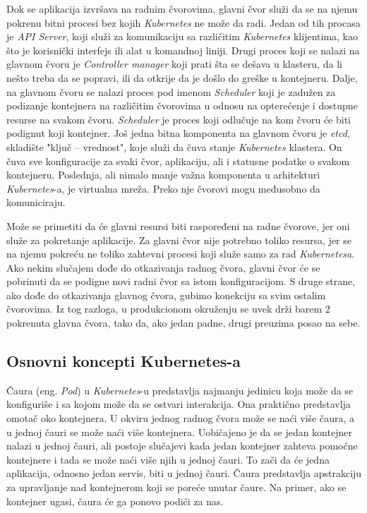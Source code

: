 Dok se aplikacija izvršava na radnim čvorovima, glavni čvor služi da se na njemu pokrenu bitni procesi 
bez kojih \textit{Kubernetes} ne može da radi. Jedan od tih procasa je {\em API Server}, koji služi za 
komunikaciju sa različitim \textit{Kubernetes} klijentima, kao što je korisnički interfejs ili alat u 
komandnoj liniji. Drugi proces koji se nalazi na glavnom čvoru je {\em Controller manager} koji 
prati šta se dešava u klasteru, da li nešto treba da se popravi, ili da otkrije da je došlo do greške 
u kontejneru. Dalje, na glavnom čvoru se nalazi proces pod imenom {\em Scheduler} koji je zadužen 
za podizanje kontejnera na različitim čvorovima u odnosu na opterećenje i dostupne resurse na svakom 
čvoru. \textit{Scheduler} je proces koji odlučuje na kom čvoru će biti podignut koji kontejner. 
Još jedna bitna komponenta na glavnom čvoru je {\em etcd}, skladište "ključ -- vrednost", koje služi 
da čuva stanje \textit{Kubernetes} klastera. On čuva sve konfiguracije za svaki čvor, aplikaciju, ali i statusne 
podatke o svakom kontejneru. Poslednja, ali nimalo manje važna komponenta u arhitekturi \textit{Kubernetes}-a, 
je virtualna mreža. Preko nje čvorovi mogu međusobno da komuniciraju. 

Može se primetiti da će glavni resursi biti raspoređeni na radne čvorove, jer oni služe za pokretanje 
aplikacije. Za glavni čvor nije potrebno toliko resursa, jer se na njemu pokreću ne toliko zahtevni procesi 
koji služe samo za rad \textit{Kubernetesa}. Ako nekim slučajem dođe do otkazivanja radnog čvora, glavni čvor 
će se pobrinuti da se podigne novi radni čvor sa istom konfiguracijom. S druge strane, ako dođe do 
otkazivanja glavnog čvora, gubimo konekciju sa svim ostalim čvorovima. Iz tog razloga, u produkcionom 
okruženju se uvek drži barem 2 pokrenuta glavna čvora, tako da, ako jedan padne, drugi preuzima 
posao na sebe.

\subsection{Osnovni koncepti Kubernetes-a}
Čaura (eng. {\em Pod}) u \textit{Kubernetes}-u predstavlja najmanju jedinicu koja može da se konfiguriše i sa kojom može da 
se ostvari interakcija. Ona praktično predstavlja omotač oko kontejnera. U okviru jednog radnog čvora 
može se naći više čaura, a u jednoj čauri se može naći više kontejnera. Uobičajeno je da se jedan 
kontejner nalazi u jednoj čauri, ali postoje slučajevi kada jedan kontejner zahteva pomoćne kontejnere 
i tada se može naći više njih u jednoj čauri. To zači da će jedna aplikacija, odnosno jedan servis, 
biti u jednoj čauri. Čaura predstavlja apstrakciju za upravljanje nad kontejnerom koji se poreće unutar
čaure. Na primer, ako se kontejner ugasi, čaura će ga ponovo podići za nas. 


